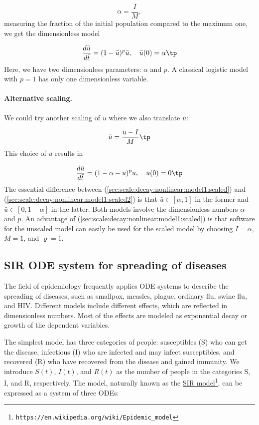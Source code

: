 \documentclass[graybox,envcountchap,sectrefs,final]{svmonodo}
\begin{document}
\[ \alpha = \frac{I}{M},\]
measuring the fraction of the initial population compared to the maximum
one, we get the dimensionless model

\begin{equation}
\frac{d\bar u}{d\bar t} = (1 - \bar u)^p \bar u,\quad
\bar u(0) =\alpha\tp
\label{sec:scale:decay:nonlinear:model1:scaled}
\end{equation}
Here, we have two dimensionless parameters: $\alpha$ and $p$. A classical
logistic model with $p=1$ has only one dimensionless variable.

\paragraph{Alternative scaling.}
We could try another scaling of $u$ where we also translate $\bar u$:

\[ \bar u = \frac{u-I}{M}\tp \]
This choice of $\bar u$ results in

\begin{equation}
\frac{d\bar u}{d\bar t} = (1 - \alpha - \bar u)^p \bar u,\quad
\bar u(0) =0\tp
\label{sec:scale:decay:nonlinear:model1:scaled2}
\end{equation}
The essential difference between (\ref{sec:scale:decay:nonlinear:model1:scaled})
and (\ref{sec:scale:decay:nonlinear:model1:scaled2}) is that
$\bar u\in [\alpha, 1]$ in the former and $\bar u \in [0, 1-\alpha]$ in
the latter. Both models involve the dimensionless numbers $\alpha$ and $p$.
An advantage of (\ref{sec:scale:decay:nonlinear:model1:scaled})
is that software for the unscaled model can easily be used for the
scaled model by choosing $I=\alpha$, $M=1$, and $\varrho=1$.

\subsection{SIR ODE system for spreading of diseases}

The field of epidemiology frequently applies ODE systems to describe
the spreading of diseases, such as smallpox, measles, plague, ordinary
flu, swine flu, and HIV. Different models include different effects,
which are reflected in dimensionless numbers. Most of the effects are
modeled as exponential decay or growth of the dependent variables.

The simplest model has three categories of people: susceptibles (S)
who can get the disease, infectious (I) who are infected and may
infect susceptibles, and recovered (R) who have recovered from the
disease and gained immunity. We introduce $S(t)$, $I(t)$, and $R(t)$
as the number of people in the categories S, I, and R, respectively.
The model, naturally known as the \href{{https://en.wikipedia.org/wiki/Epidemic_model}}{SIR model}\footnote{\texttt{https://en.wikipedia.org/wiki/Epidemic\_model}}, can be expressed as a
system of three ODEs:
\end{document}
